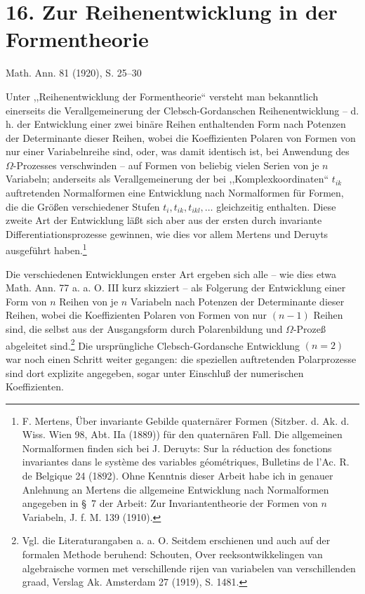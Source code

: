 \documentclass[11pt]{article}
\begin{document}
\section*{16. Zur Reihenentwicklung in der Formentheorie}
\begin{center}
Math. Ann. 81 (1920), S. 25--30
\end{center}

Unter ,,Reihenentwicklung der Formentheorie`` versteht man bekanntlich einerseits die Verallgemeinerung der Clebsch-Gordanschen Reihenentwicklung -- d. h. der Entwicklung einer zwei binäre Reihen enthaltenden Form nach Potenzen der Determinante dieser Reihen, wobei die Koeffizienten Polaren von Formen von nur einer Variabelnreihe sind, oder, was damit identisch ist, bei Anwendung des $\Omega$-Prozesses verschwinden -- auf Formen von beliebig vielen Serien von je $n$ Variabeln; anderseits als Verallgemeinerung der bei ,,Komplexkoordinaten`` $t_{ik}$ auftretenden Normalformen eine Entwicklung nach Normalformen für Formen, die die Größen verschiedener Stufen $t_i,t_{ik},t_{ikl},\ldots$ gleichzeitig enthalten. Diese zweite Art der Entwicklung läßt sich aber aus der ersten durch invariante Differentiationsprozesse gewinnen, wie dies vor allem Mertens und Deruyts ausgeführt haben.\footnote{F. Mertens, Über invariante Gebilde quaternärer Formen (Sitzber. d. Ak. d. Wiss. Wien 98, Abt. IIa (1889)) für den quaternären Fall. Die allgemeinen Normalformen finden sich bei J. Deruyts: Sur la réduction des fonctions invariantes dans le système des variables géométriques, Bulletins de l'Ac. R. de Belgique 24 (1892). Ohne Kenntnis dieser Arbeit habe ich in genauer Anlehnung an Mertens die allgemeine Entwicklung nach Normalformen angegeben in \S~7 der Arbeit: Zur Invariantentheorie der Formen von $n$ Variabeln, J. f. M. 139 (1910).}

Die verschiedenen Entwicklungen erster Art ergeben sich alle -- wie dies etwa Math. Ann. 77 a. a. O. III kurz skizziert -- als Folgerung der Entwicklung einer Form von $n$ Reihen von je $n$ Variabeln nach Potenzen der Determinante dieser Reihen, wobei die Koeffizienten Polaren von Formen von nur $(n-1)$ Reihen sind, die selbst aus der Ausgangsform durch Polarenbildung und $\Omega$-Prozeß abgeleitet sind.\footnote{Vgl. die Literaturangaben a. a. O. Seitdem erschienen und auch auf der formalen Methode beruhend: Schouten, Over reeksontwikkelingen van algebraische vormen met verschillende rijen van variabelen van verschillenden graad, Verslag Ak. Amsterdam 27 (1919), S. 1481.} Die ursprüngliche Clebsch-Gordansche Entwicklung $(n=2)$ war noch einen Schritt weiter gegangen: die speziellen auftretenden Polarprozesse sind dort explizite angegeben, sogar unter Einschluß der numerischen Koeffizienten.
\end{document}
